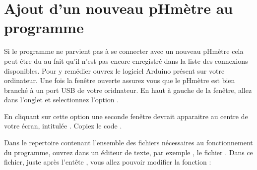 \documentclass[letterpaper,10pt,french]{sphinxmanual}
\begin{document}
\section{Ajout d’un nouveau pH\sphinxhyphen{}mètre au programme}
\label{\detokenize{install:ajout-d-un-nouveau-ph-metre-au-programme}}
\sphinxAtStartPar
Si le programme ne parvient pas à se connecter avec un nouveau pH\sphinxhyphen{}mètre cela peut être du au fait qu’il n’est pas encore enregistré dans la liste des connexions
disponibles. Pour y remédier ouvrez le logiciel Arduino présent sur votre ordinateur. Une fois la fenêtre ouverte assurez vous que le pH\sphinxhyphen{}mètre est bien branché à un port USB de
votre oridnateur. En haut à gauche de la fenêtre, allez dans l’onglet  et selectionnez l’option .

\noindent{}

\sphinxAtStartPar
En cliquant sur cette option une seconde fenêtre devrait apparaitre au centre de votre écran, intitulée . Copiez le code .

\noindent{}

\sphinxAtStartPar
Dans le repertoire  contenant l’ensemble des fichiers nécessaires au fonctionnement du programme, ouvrez dans un éditeur de texte, par exemple ,
le fichier . Dans ce fichier, juste après l’entête , vous allez pouvoir modifier la fonction :
\end{document}
